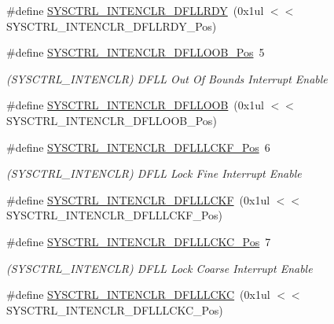 \begin{DoxyCompactItemize}
\#define \mbox{\hyperlink{group___s_a_m_d21___s_y_s_c_t_r_l_gacdeb9619d34a3fb0e7e2c24cfa0301e4}{S\+Y\+S\+C\+T\+R\+L\+\_\+\+I\+N\+T\+E\+N\+C\+L\+R\+\_\+\+D\+F\+L\+L\+R\+DY}}~(0x1ul $<$$<$ S\+Y\+S\+C\+T\+R\+L\+\_\+\+I\+N\+T\+E\+N\+C\+L\+R\+\_\+\+D\+F\+L\+L\+R\+D\+Y\+\_\+\+Pos)
\item 
\#define \mbox{\hyperlink{group___s_a_m_d21___s_y_s_c_t_r_l_gaab87cba482b19fe5acc1f1da859d1f7b}{S\+Y\+S\+C\+T\+R\+L\+\_\+\+I\+N\+T\+E\+N\+C\+L\+R\+\_\+\+D\+F\+L\+L\+O\+O\+B\+\_\+\+Pos}}~5
\begin{DoxyCompactList}\small\item\em (S\+Y\+S\+C\+T\+R\+L\+\_\+\+I\+N\+T\+E\+N\+C\+LR) D\+F\+LL Out Of Bounds Interrupt Enable \end{DoxyCompactList}\item 
\#define \mbox{\hyperlink{group___s_a_m_d21___s_y_s_c_t_r_l_ga6d30d85e011fe21f91e18d70f94f3c8e}{S\+Y\+S\+C\+T\+R\+L\+\_\+\+I\+N\+T\+E\+N\+C\+L\+R\+\_\+\+D\+F\+L\+L\+O\+OB}}~(0x1ul $<$$<$ S\+Y\+S\+C\+T\+R\+L\+\_\+\+I\+N\+T\+E\+N\+C\+L\+R\+\_\+\+D\+F\+L\+L\+O\+O\+B\+\_\+\+Pos)
\item 
\#define \mbox{\hyperlink{group___s_a_m_d21___s_y_s_c_t_r_l_ga3f72516c671e1d432d4bbbbd2d12d4f1}{S\+Y\+S\+C\+T\+R\+L\+\_\+\+I\+N\+T\+E\+N\+C\+L\+R\+\_\+\+D\+F\+L\+L\+L\+C\+K\+F\+\_\+\+Pos}}~6
\begin{DoxyCompactList}\small\item\em (S\+Y\+S\+C\+T\+R\+L\+\_\+\+I\+N\+T\+E\+N\+C\+LR) D\+F\+LL Lock Fine Interrupt Enable \end{DoxyCompactList}\item 
\#define \mbox{\hyperlink{group___s_a_m_d21___s_y_s_c_t_r_l_gaa75741fc7e89f02fb8a97cb5a8a9cbc5}{S\+Y\+S\+C\+T\+R\+L\+\_\+\+I\+N\+T\+E\+N\+C\+L\+R\+\_\+\+D\+F\+L\+L\+L\+C\+KF}}~(0x1ul $<$$<$ S\+Y\+S\+C\+T\+R\+L\+\_\+\+I\+N\+T\+E\+N\+C\+L\+R\+\_\+\+D\+F\+L\+L\+L\+C\+K\+F\+\_\+\+Pos)
\item 
\#define \mbox{\hyperlink{group___s_a_m_d21___s_y_s_c_t_r_l_gae8b3993680a11f69cf1a3250821273e7}{S\+Y\+S\+C\+T\+R\+L\+\_\+\+I\+N\+T\+E\+N\+C\+L\+R\+\_\+\+D\+F\+L\+L\+L\+C\+K\+C\+\_\+\+Pos}}~7
\begin{DoxyCompactList}\small\item\em (S\+Y\+S\+C\+T\+R\+L\+\_\+\+I\+N\+T\+E\+N\+C\+LR) D\+F\+LL Lock Coarse Interrupt Enable \end{DoxyCompactList}\item 
\#define \mbox{\hyperlink{group___s_a_m_d21___s_y_s_c_t_r_l_gafd8d0c92dff065b3e8379b7719131ddf}{S\+Y\+S\+C\+T\+R\+L\+\_\+\+I\+N\+T\+E\+N\+C\+L\+R\+\_\+\+D\+F\+L\+L\+L\+C\+KC}}~(0x1ul $<$$<$ S\+Y\+S\+C\+T\+R\+L\+\_\+\+I\+N\+T\+E\+N\+C\+L\+R\+\_\+\+D\+F\+L\+L\+L\+C\+K\+C\+\_\+\+Pos)

\end{DoxyCompactItemize}
